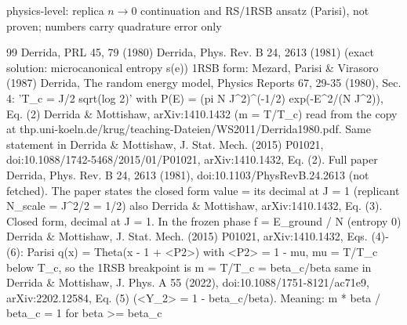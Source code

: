 \documentclass[11pt]{article}
\begin{document}
physics-level: replica $n \to 0$ continuation and RS/1RSB ansatz (Parisi), not proven; numbers carry quadrature error only


\begin{thebibliography}{99}
 Derrida, PRL 45, 79 (1980)
 Derrida, Phys. Rev. B 24, 2613 (1981) (exact solution: microcanonical entropy s(e))
 1RSB form: Mezard, Parisi \& Virasoro (1987)
 Derrida, The random energy model, Physics Reports 67, 29-35 (1980), Sec. 4: 'T\_c = J/2 sqrt(log 2)' with P(E) = (pi N J\^{}2)\^{}(-1/2) exp(-E\^{}2/(N J\^{}2)), Eq. (2)
 Derrida \& Mottishaw, arXiv:1410.1432 (m = T/T\_c)
 read from the copy at thp.uni-koeln.de/krug/teaching-Dateien/WS2011/Derrida1980.pdf. Same statement in Derrida \& Mottishaw, J. Stat. Mech. (2015) P01021, doi:10.1088/1742-5468/2015/01/P01021, arXiv:1410.1432, Eq. (2). Full paper Derrida, Phys. Rev. B 24, 2613 (1981), doi:10.1103/PhysRevB.24.2613 (not fetched). The paper states the closed form
 value = its decimal at J = 1 (replicant N\_scale = J\^{}2/2 = 1/2)
 also Derrida \& Mottishaw, arXiv:1410.1432, Eq. (3). Closed form, decimal at J = 1. In the frozen phase f = E\_ground / N (entropy 0)
 Derrida \& Mottishaw, J. Stat. Mech. (2015) P01021, arXiv:1410.1432, Eqs. (4)-(6): Parisi q(x) = Theta(x - 1 + \textless{}P2\textgreater{}) with \textless{}P2\textgreater{} = 1 - mu, mu = T/T\_c below T\_c, so the 1RSB breakpoint is m = T/T\_c = beta\_c/beta
 same in Derrida \& Mottishaw, J. Phys. A 55 (2022), doi:10.1088/1751-8121/ac71e9, arXiv:2202.12584, Eq. (5) (\textless{}Y\_2\textgreater{} = 1 - beta\_c/beta). Meaning: m * beta / beta\_c = 1 for beta \textgreater{}= beta\_c
\end{thebibliography}
\end{document}

